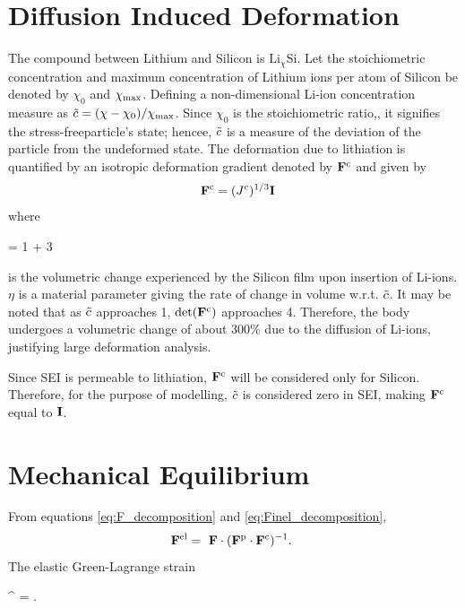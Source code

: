 \section{Diffusion Induced Deformation}
The compound between Lithium and Silicon is $\text{Li}_{\chi}$Si. Let the stoichiometric concentration and maximum concentration of Lithium ions per atom of Silicon be denoted by $\chi_0$ and $\chi_{\rm{max}}$. Defining a non-dimensional Li-ion concentration measure as $\tilde{c} = (\chi-\chi_{0})/\chi_{{\rm{max}}}$. Since $\chi_{0}$ is the stoichiometric ratio,, it signifies the stress-freeparticle's  state; hencee, $\tilde{c}$ is a measure of the deviation of the particle from the undeformed state. The deformation due to lithiation is quantified by an isotropic deformation gradient denoted by $\mathbf{F}^{\rm{c}}$ and given by
\begin{gather}
    \F^\c = (\jc)^{1/3} \I
\end{gather}
where \begin{nonumbereq}\jc = 1 + 3 \eta \xmax \tc\end{nonumbereq} is the volumetric change experienced by the Silicon film upon insertion of Li-ions. $\eta$ is a material parameter giving the rate of change in volume w.r.t. $\tilde{c}$. It may be noted that as $\tilde{c}$ approaches 1, $\mathrm{det}(\mathbf{F}^{\rm{c}})$ approaches 4. Therefore, the body undergoes a volumetric change of about 300\% due to the diffusion of Li-ions, justifying large deformation analysis.

Since SEI is permeable to lithiation, $\mathbf{F}^{\rm{c}}$ will be considered only for Silicon. Therefore, for the purpose of modelling, $\tilde{c}$ is considered zero in SEI, making $\mathbf{F}^{\rm{c}}$ equal to $\mathbf{I}$.
\section{Mechanical Equilibrium } \label{section:MechEqbm}
From equations \ref{eq:F_decomposition} and \ref{eq:Finel_decomposition},
\begin{align}
    \F^{\el} &=  \F \cdot \inv{\F^{\p} \cdot \F^{\c}}. \label{eq:Fel_tensor}
\end{align}
The elastic Green-Lagrange strain
\begin{nonumbereq}
\E^{\el} =  \left[ (\F^\el)^\T \cdot  \F^\el - \I \right].
\end{nonumbereq}

